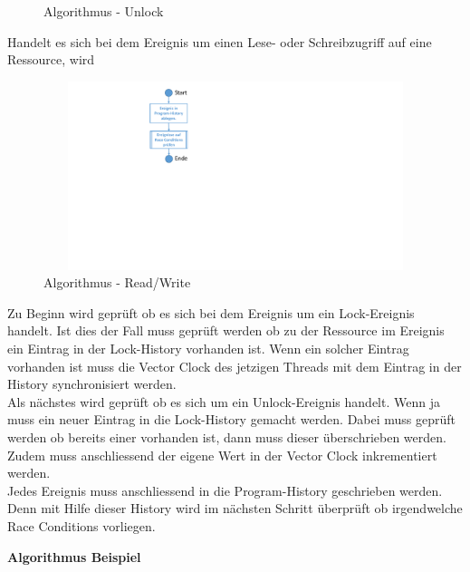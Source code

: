 \documentclass[10pt,a4paper]{article}
\begin{document}
\begin{flushleft}
\begin{figure}[H]
\caption{Algorithmus - Unlock}\label{algo_unlock}
\end{figure}
Handelt es sich bei dem Ereignis um einen Lese- oder Schreibzugriff auf eine Ressource, wird 
\begin{figure}[H]
	\includegraphics[width=15cm,height=5.5cm,trim=70mm 108mm 50mm 7mm, clip]{images/ReadWrite.pdf}
\caption{Algorithmus - Read/Write}\label{algo_unlock}
\end{figure}
Zu Beginn wird geprüft ob es sich bei dem Ereignis um ein Lock-Ereignis handelt. Ist dies der Fall muss geprüft werden ob zu der Ressource im Ereignis ein Eintrag in der Lock-History vorhanden ist. Wenn ein solcher Eintrag vorhanden ist muss die Vector Clock des jetzigen Threads mit dem Eintrag in der History synchronisiert werden.\\
Als nächstes wird geprüft ob es sich um ein Unlock-Ereignis handelt. Wenn ja muss ein neuer Eintrag in die Lock-History gemacht werden. Dabei muss geprüft werden ob bereits einer vorhanden ist, dann muss dieser überschrieben werden. Zudem muss anschliessend der eigene Wert in der Vector Clock inkrementiert werden.\\
Jedes Ereignis muss anschliessend in die Program-History geschrieben werden. Denn mit Hilfe dieser History wird im nächsten Schritt überprüft ob irgendwelche Race Conditions vorliegen.
\end{flushleft}
\textbf{Algorithmus Beispiel}
\end{document}
